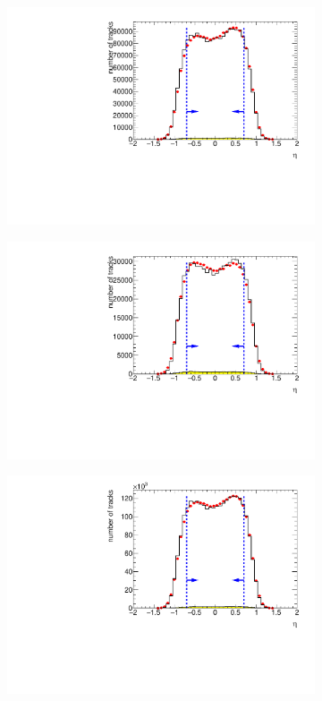 \begin{figure}[h!]
\begin{subfigure}{.45\textwidth}
		\includegraphics[width=\textwidth, page=12]{chapters/chrgSTAR/img/selection/SDT_0.pdf}
		\caption{}
	\end{subfigure}
	\begin{subfigure}{.45\textwidth}
		\includegraphics[width=\textwidth, page=12]{chapters/chrgSTAR/img/selection/SDT_1.pdf}
		\caption{}
	\end{subfigure}
	\begin{subfigure}{.45\textwidth}
		\includegraphics[width=\textwidth, page=4]{chapters/chrgSTAR/img/selection/SDT.pdf}

\end{subfigure}
\end{figure}
